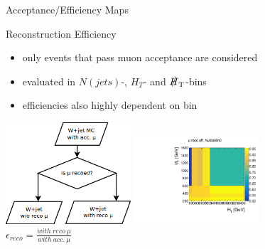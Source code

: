 \begin{frame}{Acceptance/Efficiency Maps}

\begin{block}{Reconstruction Efficiency}
\begin{itemize}
\item only events that pass muon acceptance are considered
\item evaluated in $N(\si{jets})$-, $H_{\si{T}}$- and $\slashed H_{\si{T}}$-bins
\item efficiencies also highly dependent on bin
\end{itemize}
\end{block}

\begin{center}
\includegraphics[width = 0.35\textwidth]{figures/MuonReco.png}
\includegraphics[width = 0.35\textwidth]{plots11/MuonRecoEff_NJetsBin0.pdf}\\
$\epsilon_{\si{reco}} = \frac{\si{with~reco~\mu}}{\si{with~acc.~\mu}}$
\end{center}

\end{frame}


